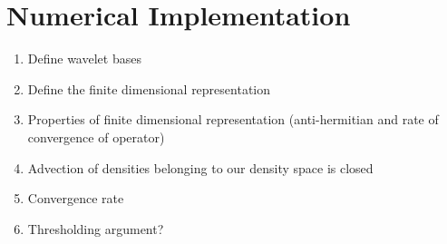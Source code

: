 \section{Numerical Implementation}\label{sec:Implementation}

\begin{enumerate}
	\item Define wavelet bases
	\item Define the finite dimensional representation
	\item Properties of finite dimensional representation (anti-hermitian and rate of convergence of operator)
	\item Advection of densities belonging to our density space is closed
	\item Convergence rate
	\item Thresholding argument?
\end{enumerate}